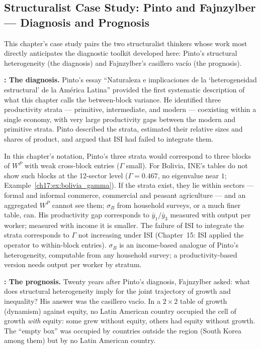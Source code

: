 \documentclass[../structural_economics_book.tex]{subfiles}
\begin{document}
\subsection*{Structuralist Case Study: Pinto and Fajnzylber --- Diagnosis and Prognosis}

This chapter's case study pairs the two structuralist thinkers whose work most directly anticipates the diagnostic toolkit developed here: Pinto's structural heterogeneity (the diagnosis) and Fajnzylber's casillero vac\'{i}o (the prognosis).

\textbf{\citet{pinto1970naturaleza}: The diagnosis.} Pinto's essay ``Naturaleza e implicaciones de la `heterogeneidad estructural' de la Am\'{e}rica Latina'' provided the first systematic description of what this chapter calls the between-block variance. He identified three productivity strata --- primitive, intermediate, and modern --- coexisting within a single economy, with very large productivity gaps between the modern and primitive strata. %
Pinto described the strata, estimated their relative sizes and shares of product, and argued that ISI had failed to integrate them.

In this chapter's notation, Pinto's three strata would correspond to three blocks of $W^P$ with weak cross-block entries ($\Gamma$ small). For Bolivia, INE's tables do not show such blocks at the 12-sector level ($\Gamma = 0.467$, no eigenvalue near $1$; Example~\ref{ch17:ex:bolivia_gamma}). If the strata exist, they lie within sectors --- formal and informal commerce, commercial and peasant agriculture --- and an aggregated $W^P$ cannot see them; $\sigma_B$ from household surveys, or a much finer table, can. His productivity gap corresponds to $\bar{y}_1/\bar{y}_3$ measured with output per worker; measured with income it is smaller. The failure of ISI to integrate the strata corresponds to $\Gamma$ not increasing under ISI (Chapter~15: ISI applied the operator to within-block entries). $\sigma_B$ is an income-based analogue of Pinto's heterogeneity, computable from any household survey; a productivity-based version needs output per worker by stratum.

\textbf{\citet{fajnzylber1990industrializacion}: The prognosis.} Twenty years after Pinto's diagnosis, Fajnzylber asked: what does structural heterogeneity imply for the joint trajectory of growth and inequality? His answer was the casillero vac\'{i}o. In a $2 \times 2$ table of growth (dynamism) against equity, no Latin American country occupied the cell of growth \emph{with} equity: some grew without equity, others had equity without growth. The ``empty box'' was occupied by countries outside the region (South Korea among them) but by no Latin American country.
\end{document}
